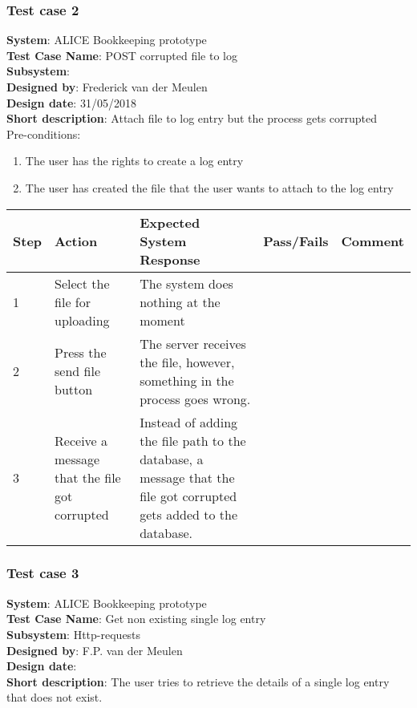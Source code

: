 \subsubsection{Test case 2}
\textbf{System}:   ALICE Bookkeeping prototype\\
\textbf{Test Case Name}:  POST corrupted file to log\\
\textbf{Subsystem}:  \\
\textbf{Designed by}:  Frederick van der Meulen\\
\textbf{Design date}:  31/05/2018\\
\textbf{Short description}: Attach file to log entry but the process gets corrupted \\

Pre-conditions: \\
\begin{enumerate}
\item The user has the rights to create a log entry
\item The user has created the file that the user wants to attach to the log entry
\end{enumerate}

\begin{longtable}{ | p{0.8cm} | p{4.5cm} | p{6cm} | p{1.5cm} | p{1.5cm} |}
\hline
Step & Action & Expected System Response & Pass/Fails & Comment \\ \hline
1 & Select the file for uploading & The system does nothing at the moment & & \\ \hline
2 & Press the send file button & The server receives the file, however, something in the process goes wrong. & & \\ \hline
3 & Receive a message that the file got corrupted & Instead of adding the file path to the database, a message that the file got corrupted gets added to the database. & & \\ \hline
\end{longtable}

\subsubsection{Test case 3}
\textbf{System}:  ALICE Bookkeeping prototype \\
\textbf{Test Case Name}:  Get non existing single log entry \\
\textbf{Subsystem}:  Http-requests \\
\textbf{Designed by}:  F.P. van der Meulen\\
\textbf{Design date}:  \\
\textbf{Short description}: The user tries to retrieve the details of a single log entry that does not exist. \\

